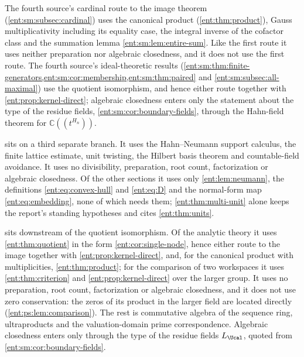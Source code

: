 \documentclass[11pt]{article}
\theoremstyle{plain}
\theoremstyle{plain}
\theoremstyle{plain}
\theoremstyle{definition}
\theoremstyle{definition}
\theoremstyle{definition}
\theoremstyle{definition}
\theoremstyle{remark}
\newcommand{\C}{\mathbb C}\newcommand{\R}{\mathbb R}
\begin{document}
The fourth source's cardinal route to the image theorem
(\cref{ent:sm:subsec:cardinal}) uses the canonical product
(\cref{ent:thm:product}), Gauss multiplicativity including its equality
case, the integral inverse of the cofactor class and the summation lemma
\cref{ent:sm:lem:entire-sum}. Like the first route it uses neither
preparation nor algebraic closedness, and it does not use the first route.
The fourth source's ideal-theoretic results
(\cref{ent:sm:thm:finite-generators,ent:sm:cor:membership,ent:sm:thm:paired}
and \cref{ent:sm:subsec:all-maximal}) use the quotient isomorphism, and hence
either route together with \cref{ent:prop:kernel-direct}; algebraic
closedness enters only the statement about the type of the residue fields,
\cref{ent:sm:cor:boundary-fields}, through the Hahn-field theorem for
$\C((t^{H_n}))$.

 sits on a third separate branch. It uses the
Hahn--Neumann support calculus, the finite lattice estimate, unit twisting,
the Hilbert basis theorem and countable-field avoidance. It uses no
divisibility, preparation, root count, factorization or algebraic closedness.
Of the other sections it uses only \cref{ent:lem:neumann}, the definitions
\eqref{ent:eq:convex-hull} and \eqref{ent:eq:D} and the normal-form map
\eqref{ent:eq:embedding}, none of which needs them;
\cref{ent:thm:multi-unit} alone keeps the report's standing hypotheses and
cites \cref{ent:thm:units}.

 sits downstream of the quotient isomorphism. Of
the analytic theory it uses \cref{ent:thm:quotient} in the form
\cref{ent:cor:single-node}, hence either route to the image together with
\cref{ent:prop:kernel-direct}, and, for the canonical product with
multiplicities, \cref{ent:thm:product}; for the comparison of two workspaces
it uses \cref{ent:thm:criterion} and \cref{ent:prop:kernel-direct} over the
larger group. It uses no preparation, root count, factorization or algebraic
closedness, and it does not use zero conservation: the zeros of its product
in the larger field are located directly (\cref{ent:ps:lem:comparison}).
The rest is commutative algebra of the sequence ring, ultraproducts and the
valuation-domain prime correspondence. Algebraic closedness enters only
through the type of the residue fields $L_\Ucal$, quoted from
\cref{ent:sm:cor:boundary-fields}.
\end{document}
